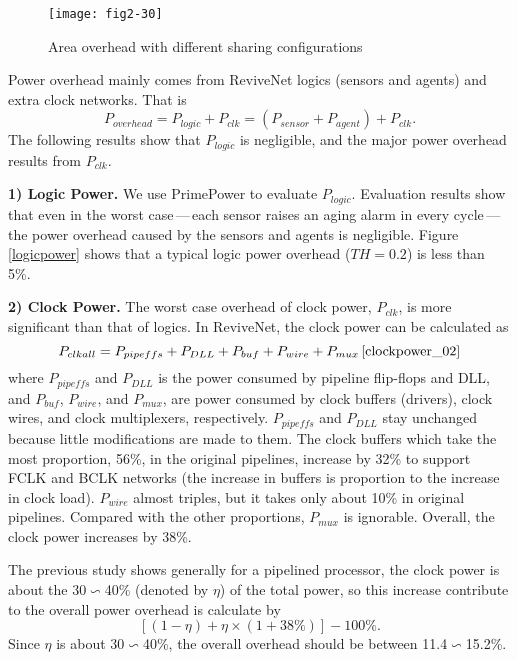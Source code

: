 \begin{figure}[t]
\centering
\texttt{[image: fig2-30]}%
\vspace{-0.3cm}
   \caption{Area overhead with different sharing configurations}\label{totalarea}
\end{figure}


\smallskip {}

Power overhead mainly comes from ReviveNet logics (sensors and agents) and extra clock networks.
That is
$$P_{overhead}=P_{logic}+P_{clk}=(P_{sensor}+P_{agent})+P_{clk}.$$ The following results show that
$P_{logic}$ is negligible, and the major power overhead results from $P_{clk}$.

{\bf 1) Logic Power.} We use PrimePower to evaluate $P_{logic}$. Evaluation results
show that even in the worst case\,---\,each sensor raises an aging alarm in every cycle\,---\,the
power overhead caused by the sensors and agents is negligible. Figure \ref{logicpower} shows that a
typical logic power overhead ($TH=0.2$) is less than 5\%.


{\bf 2) Clock Power.} The worst case overhead of clock power, $P_{clk}$, is more significant than that
of logics. In ReviveNet, the clock power can be calculated as
$$P_{clkall}=P_{pipeffs} + P_{DLL} + P_{buf} + P_{wire}+ P_{mux} \, \mbox{\cite{clockpower_02}} $$ where
$P_{pipeffs}$ and $P_{DLL}$ is the power consumed by pipeline flip-flops and DLL, and $P_{buf}$,
$P_{wire}$, and $P_{mux}$, are power consumed by  clock buffers (drivers), clock wires, and clock
multiplexers, respectively. $P_{pipeffs}$ and $P_{DLL}$ stay unchanged because little modifications
are made to them. The clock buffers which take the most proportion, 56\%,  in the original
pipelines, increase by 32\% to support FCLK and BCLK networks (the increase in buffers is
proportion to the increase in clock load). $P_{wire}$ almost triples, but it takes only about 10\%
in original pipelines. Compared with the other proportions, $P_{mux}$ is ignorable. Overall, the
clock power increases by 38\%.

The previous study \cite{clockpower_02} shows generally for a pipelined processor,
the clock power is about the 30$\backsim$40\% (denoted by $\eta$) of the total power,
so this increase contribute to the overall power overhead is calculate by
$$[(1-\eta) + \eta \times (1+38\%)] - 100\%.$$
Since $\eta$ is about 30$\backsim$40\%, the overall overhead should be between 11.4$\backsim$15.2\%.

